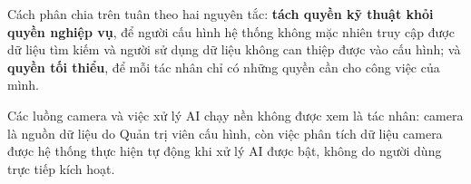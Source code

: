 Cách phân chia trên tuân theo hai nguyên tắc: \textbf{tách quyền kỹ thuật khỏi quyền nghiệp vụ}, để người cấu hình hệ thống không mặc nhiên truy cập được dữ liệu tìm kiếm và người sử dụng dữ liệu không can thiệp được vào cấu hình; và \textbf{quyền tối thiểu}, để mỗi tác nhân chỉ có những quyền cần cho công việc của mình.

Các luồng camera và việc xử lý AI chạy nền không được xem là tác nhân: camera là nguồn dữ liệu do Quản trị viên cấu hình, còn việc phân tích dữ liệu camera được hệ thống thực hiện tự động khi xử lý AI được bật, không do người dùng trực tiếp kích hoạt.
